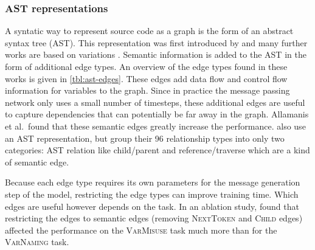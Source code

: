 \documentclass[sigconf,authordraft=true,nonacm=true]{acmart}
\begin{document}
\subsubsection{AST representations}
A syntatic way to represent source code as a graph is the form of an abstract syntax tree (AST).
This representation was first introduced by \citet{allamanis_learning_2018} and many further works are based on variations \cite{allamanis_typilus_2020,brauckmann_compiler-based_2020,fernandes_structured_2020,hellendoorn_global_2019,hellendoorn_are_2019,li_using_2019,schrouff_inferring_2019}.
Semantic information is added to the AST in the form of additional edge types.
An overview of the edge types found in these works is given in \cref{tbl:ast-edges}.
These edges add data flow and control flow information for variables to the graph.
Since in practice the message passing network only uses a small number of timesteps, these additional edges are useful to capture dependencies that can potentially be far away in the graph.
Allamanis et al.\ found that these semantic edges greatly increase the performance.
\citet{schrouff_inferring_2019} also use an AST representation, but group their 96 relationship types into only two categories: AST relation like child/parent and reference/traverse which are a kind of semantic edge.

Because each edge type requires its own parameters for the message generation step of the model, restricting the edge types can improve training time.
Which edges are useful however depends on the task.
In an ablation study, \citet{allamanis_learning_2018} found that restricting the edges to semantic edges (removing \textsc{NextToken} and \textsc{Child} edges) affected the performance on the \textsc{VarMisuse} task much more than for the \textsc{VarNaming} task.
\end{document}
